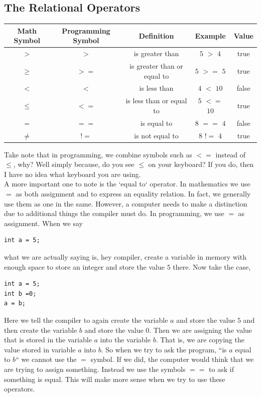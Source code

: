 \documentclass[11]{article}
\begin{document}
\subsection{The Relational Operators}
\begin{center}
  \begin{tabular}{ | c | c | c | c | c |}
    \hline
    Math Symbol & Programming Symbol & Definition & Example & Value \\ \hline
    $>$ & $>$ & is greater than & $5$ $>$ $4$ & true \\ \hline
    $\geq$ & $>=$ & is greater than or equal to & $5$ $>=$ $5$ & true \\ \hline
    $<$ & $<$ & is less than & $4$ $<$ $10$ & false \\ \hline
    $\leq$ & $<=$ & is less than or equal to & $5$ $<=$ $10$ & true \\ \hline
    $=$ & $==$ & is equal to & $8$ $==$  $4$ & false \\ \hline
    $\neq$ & $!=$ & is not equal to & $8$ $!=$  $4$ & true \\ 
    \hline
  \end{tabular}
\end{center}

Take note that in programming, we combine symbols such as $<=$ instead of $\leq$, why? Well simply because, do you see $\leq$ on your keyboard? If you do, then I have no idea what keyboard you are using. \\

A more important one to note is the 	`equal to` operator. In mathematics we use $=$ as both assignment and to express an equality relation. In fact, we generally use them as one in the same. However, a computer needs to make a distinction due to additional things the compiler must do. In programming, we use $=$ as assignment. When we say 
\begin{lstlisting}
int a = 5;
\end{lstlisting}
what we are actually saying is, hey compiler, create a variable in memory with enough space to store an integer and store the value $5$ there. Now take the case, 
\begin{lstlisting}
int a = 5;
int b =0;
a = b;
\end{lstlisting}

Here we tell the compiler to again create the variable $a$ and store the value $5$ and then create the variable $b$ and store the value $0$. Then we are assigning the value that is stored in the variable $a$ into the variable $b$. That is, we are copying the value stored in variable $a$ into $b$. So when we try to ask the program, ``is $a$ equal to $b$`` we cannot use the $=$ symbol. If we did, the computer would think that we are trying to assign something. Instead we use the symbols $==$ to ask if something is equal. This will make more sense when we try to use these operators.\\
\end{document}
